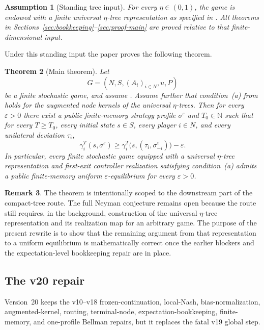 \documentclass[12pt]{article}
\newtheorem{theorem}{Theorem}[section]
\newtheorem{assumption}[theorem]{Assumption}
\theoremstyle{definition}
\newtheorem{remark}[theorem]{Remark}
\newcommand{\eps}{\varepsilon}
\newcommand{\N}{\mathbb{N}}
\newcommand{\1}{\mathbf{1}}
\begin{document}
\begin{assumption}[Standing tree input]
\label{ass:tree-input}
For every $\eta\in(0,1)$, the game is endowed with a finite universal
$\eta$-tree representation as specified in
. All theorems in
Sections~\ref{sec:bookkeeping}--\ref{sec:proof-main} are proved relative to that
finite-dimensional input.
\end{assumption}

Under this standing input the paper proves the following theorem.

\begin{theorem}[Main theorem]
\label{thm:main}
Let
\[
G=(N,S,(A_i)_{i\in N},u,P)
\]
be a finite stochastic game, and assume . Assume further
that condition~\textnormal{(a)} from  holds for the augmented node
kernels of the universal $\eta$-trees. Then for every $\eps>0$ there exist a
public finite-memory strategy profile $\sigma^\eps$ and $T_0\in\N$ such that for
every $T\ge T_0$, every initial state $s\in S$, every player $i\in N$, and every
unilateral deviation $\tau_i$,
\[
\gamma_i^T(s,\sigma^\eps)
\ge
\gamma_i^T\bigl(s,(\tau_i,\sigma^\eps_{-i})\bigr)-\eps.
\]
In particular, every finite stochastic game equipped with a universal
$\eta$-tree representation and first-exit controller realization satisfying
condition~\textnormal{(a)} admits a public finite-memory uniform
$\eps$-equilibrium for every $\eps>0$.
\end{theorem}

\begin{remark}
The theorem is intentionally scoped to the downstream part of the compact-tree
route. The full Neyman conjecture remains open because the route still requires,
in the background, construction of the universal $\eta$-tree representation and
its realization map for an arbitrary game. The purpose of the present rewrite is
to show that the remaining argument from that representation to a uniform
equilibrium is mathematically correct once the earlier blockers and the
expectation-level bookkeeping repair are in place.
\end{remark}




\subsection{The v20 repair}

Version~20 keeps the v10--v18 frozen-continuation, local-Nash,
bias-normalization, augmented-kernel, routing, terminal-node,
expectation-bookkeeping, finite-memory, and one-profile Bellman repairs, but it
replaces the fatal v19 global step.
\end{document}
